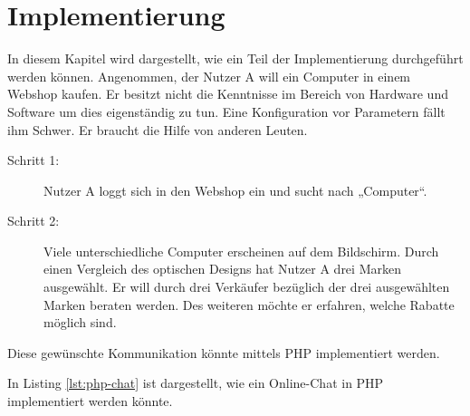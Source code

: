 
\chapter{Implementierung}

In diesem Kapitel wird dargestellt, wie ein Teil der Implementierung durchgeführt werden können. Angenommen, der Nutzer A will ein Computer in einem Webshop kaufen. Er besitzt nicht die Kenntnisse im Bereich von Hardware und Software um dies eigenständig zu tun. Eine Konfiguration vor Parametern fällt ihm Schwer. Er braucht die Hilfe von anderen Leuten.

\begin{description}
\item[Schritt 1:] Nutzer A loggt sich in den Webshop ein und sucht nach „Computer“.

\item[Schritt 2:] Viele unterschiedliche Computer erscheinen auf dem Bildschirm. Durch einen Vergleich des optischen Designs hat Nutzer A drei Marken ausgewählt. Er will durch drei Verkäufer bezüglich der drei ausgewählten Marken beraten werden. Des weiteren möchte er erfahren, welche Rabatte möglich sind.
\end{description}

Diese gewünschte Kommunikation könnte mittels PHP implementiert werden.

In Listing \vref{lst:php-chat} ist dargestellt, wie ein Online-Chat in PHP implementiert werden könnte.

